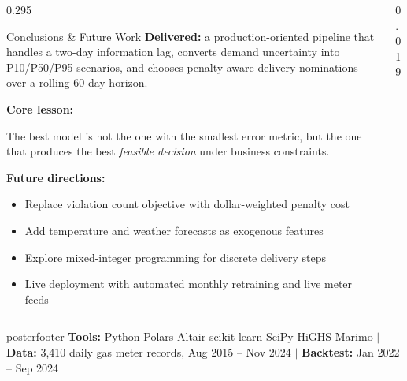 \documentclass[final]{beamer}
\begin{document}
\begin{frame}[t]{}
\begin{columns}[T]
\begin{column}{0.295\paperwidth}
    \vspace{0.75cm}

    \begin{pbox}{Conclusions \& Future Work}
      \small
      \textbf{Delivered:} a production-oriented pipeline that handles a
      two-day information lag, converts demand uncertainty into
      P10/P50/P95 scenarios, and chooses penalty-aware delivery nominations
      over a rolling 60-day horizon.

      \vspace{0.45cm}
      \textbf{Core lesson:}
      \begin{callout}
        \small The best model is not the one with the smallest error metric,
        but the one that produces the best \emph{feasible decision} under
        business constraints.
      \end{callout}

      \vspace{0.45cm}
      \textbf{Future directions:}
      \begin{itemize}
        \item Replace violation count objective with dollar-weighted
              penalty cost
        \item Add temperature and weather forecasts as exogenous features
        \item Explore mixed-integer programming for discrete delivery steps
        \item Live deployment with automated monthly retraining and
              live meter feeds
      \end{itemize}
    \end{pbox}

  \end{column}

  \begin{column}{0.019\paperwidth}\end{column}

\end{columns}

\vspace{0.8cm}
\begin{beamercolorbox}[wd=\paperwidth, ht=2.6cm, sep=0.55cm]{posterfooter}
  \centering\small
  \textbf{Tools:} Python \textbullet{} Polars \textbullet{} Altair
  \textbullet{} scikit-learn \textbullet{} SciPy HiGHS \textbullet{} Marimo
  \quad$|$\quad
  \textbf{Data:} 3,410 daily gas meter records, Aug 2015 – Nov 2024
  \quad$|$\quad
  \textbf{Backtest:} Jan 2022 – Sep 2024
\end{beamercolorbox}

\end{frame}
\end{document}
